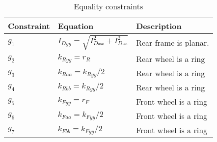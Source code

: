 \documentclass{bmd2019a}
\begin{document}
%
\begin{table}
  \caption{Equality constraints}
  \label{tab:equality-constraints}
  \centering
  \begin{tabular}{lll}
    \toprule
    Constraint & Equation & Description \\
    \midrule
    $g_1$ & $I_{Dyy} = \sqrt{I_{Dxx}^2 + I_{Dzz}^2}$ & Rear frame is planar. \\
    $g_2$ & $k_{Ryy} = r_R$  & Rear wheel is a ring \\
    $g_3$ & $k_{Raa} = k_{Ryy}/2$ & Rear wheel is a ring \\
    $g_4$ & $k_{Rbb} = k_{Ryy}/2$ & Rear wheel is a ring \\
    $g_5$ & $k_{Fyy} = r_F$  & Front wheel is a ring \\
    $g_6$ & $k_{Faa} = k_{Fyy}/2$ & Front wheel is a ring \\
    $g_7$ & $k_{Fbb} = k_{Fyy}/2$ & Front wheel is a ring \\
    \bottomrule
  \end{tabular}
\end{table}
%
\end{document}

